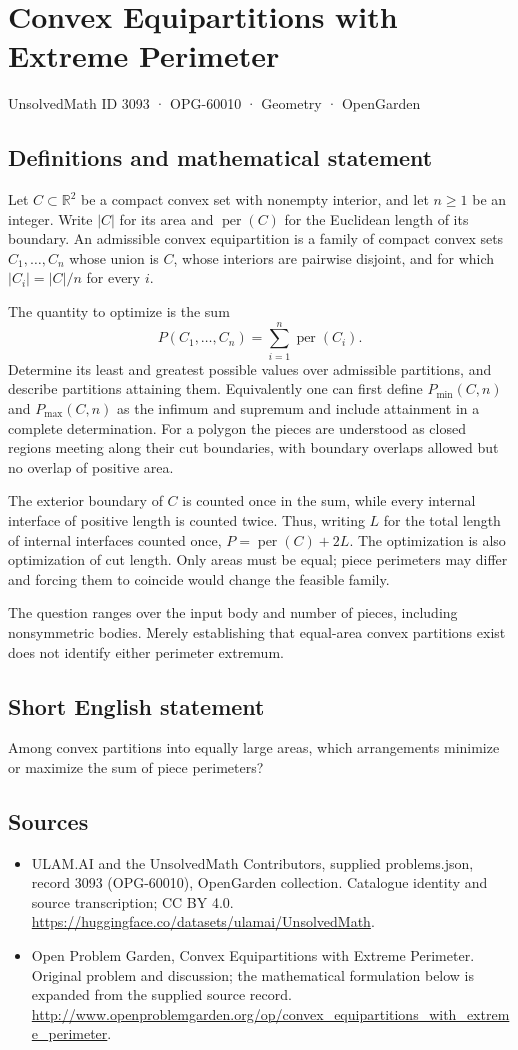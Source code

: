 \documentclass[11pt,a4paper]{article}
\begin{document}
\section*{Convex Equipartitions with Extreme Perimeter}\label{3093}
{\small UnsolvedMath ID 3093 · OPG-60010 · Geometry · OpenGarden}
\subsection{Definitions and mathematical statement}
Let $C\subset\mathbb R^2$ be a compact convex set with nonempty interior,
and let $n\ge1$ be an integer. Write $|C|$ for its area and
$\operatorname{per}(C)$ for the Euclidean length of its boundary.
An admissible convex equipartition is a family of compact convex sets
$C_1,\ldots,C_n$ whose union is $C$, whose interiors are pairwise disjoint,
and for which $|C_i|=|C|/n$ for every $i$.

The quantity to optimize is the sum
\[
 P(C_1,\ldots,C_n)=\sum_{i=1}^n\operatorname{per}(C_i).
\]
Determine its least and greatest possible values over admissible partitions,
and describe partitions attaining them. Equivalently one can first define
$P_{\min}(C,n)$ and $P_{\max}(C,n)$ as the infimum and supremum and
include attainment in a complete determination. For a polygon the pieces
are understood as closed regions meeting along their cut boundaries,
with boundary overlaps allowed but no overlap of positive area.

The exterior boundary of $C$ is counted once in the sum, while every
internal interface of positive length is counted twice. Thus, writing
$L$ for the total length of internal interfaces counted once,
$P=\operatorname{per}(C)+2L$. The optimization is also optimization of
cut length. Only areas must be equal; piece perimeters may differ and
forcing them to coincide would change the feasible family.

The question ranges over the input body and number of pieces, including
nonsymmetric bodies. Merely establishing that equal-area convex partitions
exist does not identify either perimeter extremum.
\subsection{Short English statement}
Among convex partitions into equally large areas, which arrangements minimize or maximize the sum of piece perimeters?
\subsection{Sources}
\begin{itemize}
\item[S1] ULAM.AI and the UnsolvedMath Contributors, supplied problems.json, record 3093 (OPG-60010), OpenGarden collection. Catalogue identity and source transcription; CC BY 4.0.
\url{https://huggingface.co/datasets/ulamai/UnsolvedMath}.
\item[S2] Open Problem Garden, Convex Equipartitions with Extreme Perimeter. Original problem and discussion; the mathematical formulation below is expanded from the supplied source record.
\url{http://www.openproblemgarden.org/op/convex_equipartitions_with_extreme_perimeter}.
\end{itemize}
\end{document}
